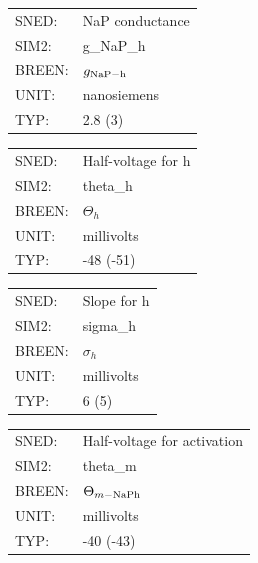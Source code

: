 \documentclass[12pt,openany,oneside]{book}
\begin{document}
\begin{flushleft}
\begin{tabular}{@{}ll@{}}
SNED: & NaP conductance\\
SIM2: & g\_NaP\_h\\
BREEN: & $g_{\rm NaP-h}$\\
UNIT: & nanosiemens\\
TYP: & 2.8 (3)\\
\end{tabular}
\end{flushleft}
\filbreak
\vspace{\baselineskip}

\begin{flushleft}
\begin{tabular}{@{}ll@{}}
SNED: & Half-voltage for h\\
SIM2: & theta\_h\\
BREEN: & $\Theta_h$\\
UNIT: & millivolts\\
TYP: & -48 (-51)\\
\end{tabular}
\end{flushleft}
\filbreak
\vspace{\baselineskip}

\begin{flushleft}
\begin{tabular}{@{}ll@{}}
SNED: & Slope for h\\
SIM2: & sigma\_h\\
BREEN: & $\sigma_h$\\
UNIT: & millivolts\\
TYP: & 6 (5)\\
\end{tabular}
\end{flushleft}
\filbreak
\vspace{\baselineskip}

\begin{flushleft}
\begin{tabular}{@{}ll@{}}
SNED: & Half-voltage for activation\\
SIM2: & theta\_m\\
BREEN: & $\Theta_{m-\rm NaPh}$\\
UNIT: & millivolts\\
TYP: & -40 (-43)\\
\end{tabular}
\end{flushleft}
\filbreak
\vspace{\baselineskip}
\end{document}
